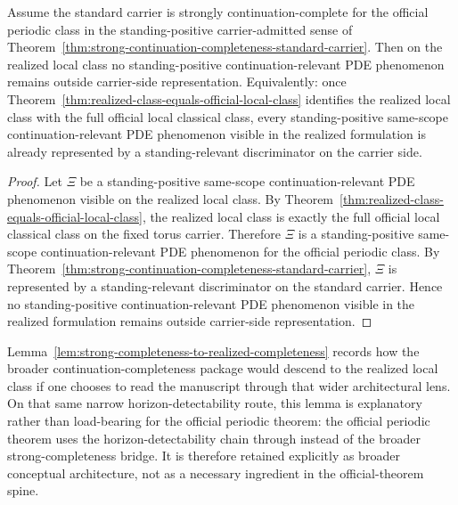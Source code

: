 \begin{lemma}\label{lem:strong-completeness-to-realized-completeness}
Assume the standard carrier is strongly continuation-complete for the official periodic class in the standing-positive carrier-admitted sense of Theorem~\ref{thm:strong-continuation-completeness-standard-carrier}. Then on the realized local class no standing-positive continuation-relevant PDE phenomenon remains outside carrier-side representation. Equivalently: once Theorem~\ref{thm:realized-class-equals-official-local-class} identifies the realized local class with the full official local classical class, every standing-positive same-scope continuation-relevant PDE phenomenon visible in the realized formulation is already represented by a standing-relevant discriminator on the carrier side.
\end{lemma}

\begin{proof}
Let $\Xi$ be a standing-positive same-scope continuation-relevant PDE phenomenon visible on the realized local class. By Theorem~\ref{thm:realized-class-equals-official-local-class}, the realized local class is exactly the full official local classical class on the fixed torus carrier. Therefore $\Xi$ is a standing-positive same-scope continuation-relevant PDE phenomenon for the official periodic class. By Theorem~\ref{thm:strong-continuation-completeness-standard-carrier}, $\Xi$ is represented by a standing-relevant discriminator on the standard carrier. Hence no standing-positive continuation-relevant PDE phenomenon visible in the realized formulation remains outside carrier-side representation.
\end{proof}

\begin{remark}
Lemma~\ref{lem:strong-completeness-to-realized-completeness} records how the broader continuation-completeness package would descend to the realized local class if one chooses to read the manuscript through that wider architectural lens. On that same narrow horizon-detectability route, this lemma is explanatory rather than load-bearing for the official periodic theorem: the official periodic theorem uses the horizon-detectability chain through \HorizonDetectabilityRef{} instead of the broader strong-completeness bridge. It is therefore retained explicitly as broader conceptual architecture, not as a necessary ingredient in the official-theorem spine.
\end{remark}

